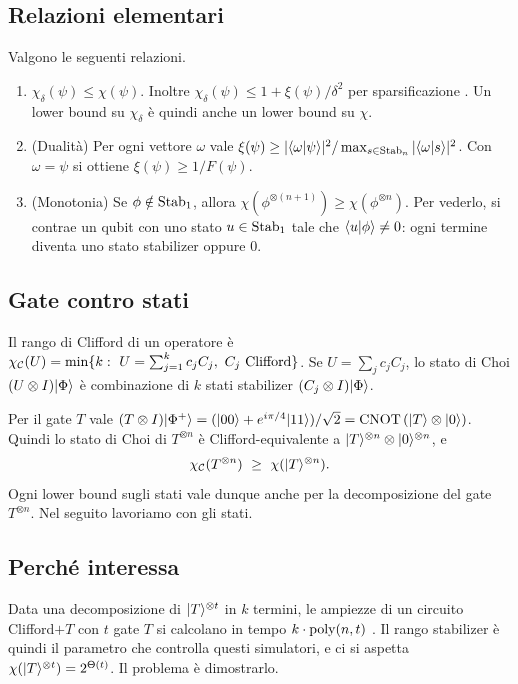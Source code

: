\subsection{Relazioni elementari}
Valgono le seguenti relazioni.
\begin{enumerate}[label=(R\arabic*),leftmargin=2.5em]
\item\label{R1} $\chi_\delta(\psi)\le\chi(\psi)$. Inoltre $\chi_\delta(\psi)\le 1+\xi(\psi)/\delta^2$ per sparsificazione \cite{BBCCGH19}. Un lower bound su $\chi_\delta$ è quindi anche un lower bound su $\chi$.
\item\label{R2} (Dualità) Per ogni vettore $\omega$ vale $\xi(\psi)\ge|\langle \omega\vert \psi\rangle|^2/\max_{s\in\mathrm{Stab}_n}|\langle \omega\vert s\rangle|^2$. Con $\omega=\psi$ si ottiene $\xi(\psi)\ge 1/F(\psi)$.
\item\label{R3} (Monotonia) Se $\phi\notin\mathrm{Stab}_1$, allora $\chi(\phi^{\otimes(n+1)})\ge\chi(\phi^{\otimes n})$. Per vederlo, si contrae un qubit con uno stato $u\in\mathrm{Stab}_1$ tale che $\langle u\vert \phi\rangle\neq0$: ogni termine diventa uno stato stabilizer oppure $0$.
\end{enumerate}

\subsection{Gate contro stati}
Il rango di Clifford di un operatore è $\chi_\Cl(U)=\min\{k:\ U=\sum_{j=1}^k c_jC_j,\ C_j\ \text{Clifford}\}$. Se $U=\sum_jc_jC_j$, lo stato di Choi $(U\otimes I)\lvert \Phi\rangle$ è combinazione di $k$ stati stabilizer $(C_j\otimes I)\lvert \Phi\rangle$.

Per il gate $T$ vale $(T\otimes I)\lvert \Phi^+\rangle=(\lvert 00\rangle+e^{i\pi/4}\lvert 11\rangle)/\sqrt2=\mathrm{CNOT}\,(\lvert T\rangle\otimes\lvert 0\rangle)$. Quindi lo stato di Choi di $T^{\otimes n}$ è Clifford-equivalente a $\lvert T\rangle^{\otimes n}\otimes\lvert 0\rangle^{\otimes n}$, e
\[
\chi_\mathcal C(T^{\otimes n})\ \ge\ \chi(\lvert T\rangle^{\otimes n}).
\]
Ogni lower bound sugli stati vale dunque anche per la decomposizione del gate $T^{\otimes n}$. Nel seguito lavoriamo con gli stati.

\subsection{Perché interessa}
Data una decomposizione di $\lvert T\rangle^{\otimes t}$ in $k$ termini, le ampiezze di un circuito Clifford$+T$ con $t$ gate $T$ si calcolano in tempo $k\cdot\mathrm{poly}(n,t)$ \cite{BG16,BBCCGH19}. Il rango stabilizer è quindi il parametro che controlla questi simulatori, e ci si aspetta $\chi(\lvert T\rangle^{\otimes t})=2^{\Theta(t)}$. Il problema è dimostrarlo.
